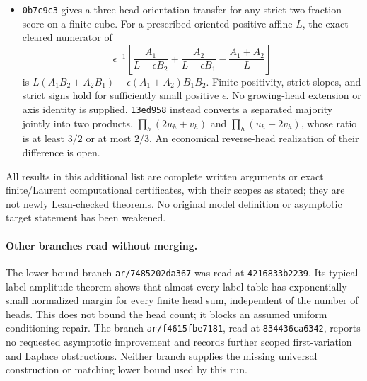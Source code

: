 \documentclass[11pt]{article}
\begin{document}
\begin{itemize}
unchanged to descendant Haar readouts, which introduce new masks.
\item \texttt{0b7c9c3} gives a three-head orientation transfer for any
strict two-fraction score on a finite cube. For a prescribed oriented
positive affine $L$, the exact cleared numerator of
\[
 \epsilon^{-1}\left[
 \frac{A_1}{L-\epsilon B_2}+\frac{A_2}{L-\epsilon B_1}
 -\frac{A_1+A_2}{L}\right]
\]
is $L(A_1B_2+A_2B_1)-\epsilon(A_1+A_2)B_1B_2$.
Finite positivity, strict slopes, and strict signs hold for sufficiently
small positive $\epsilon$. No growing-head extension or axis identity
is supplied. \texttt{13ed958} instead converts a separated majority
jointly into two products, $\prod_h(2u_h+v_h)$ and
$\prod_h(u_h+2v_h)$, whose ratio is at least $3/2$ or at most $2/3$.
An economical reverse-head realization of their difference is open.
\end{itemize}
All results in this additional list are complete written arguments
or exact finite/Laurent computational certificates, with their scopes
as stated; they are not newly Lean-checked theorems. No original model
definition or asymptotic target statement has been weakened.

\paragraph{Other branches read without merging.}
The lower-bound branch \texttt{ar/7485202da367} was read at
\texttt{4216833b2239}. Its typical-label amplitude theorem shows that
almost every label table has exponentially small normalized margin
for every finite head sum, independent of the number of heads. This
does not bound the head count; it blocks an assumed uniform
conditioning repair. The branch \texttt{ar/f4615fbe7181}, read at
\texttt{834436ca6342}, reports no requested asymptotic improvement
and records further scoped first-variation and Laplace obstructions.
Neither branch supplies the missing universal construction or matching
lower bound used by this run.
\end{document}
